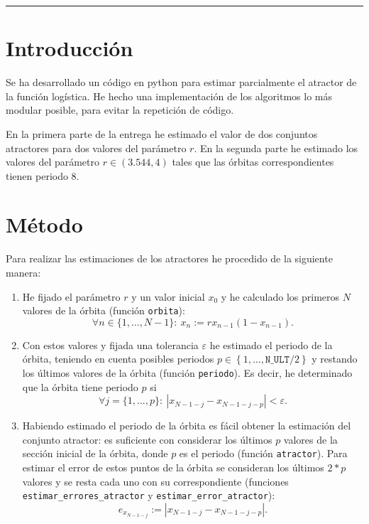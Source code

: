 \documentclass[10pt, spanish]{article}
\theoremstyle{definition}
\theoremstyle{break}
\begin{document}
 \noindent\rule{17cm}{1pt}

\section{Introducción}

Se ha desarrollado un código en python para estimar parcialmente el atractor de
la función logística. He hecho una implementación de los algoritmos lo más
modular posible, para evitar la repetición de código.

En la primera parte de la entrega he estimado el valor de dos conjuntos
atractores para dos valores del parámetro $r$. En la segunda parte he estimado los valores del parámetro $r\in(3.544,4)$ tales
que las órbitas correspondientes tienen periodo 8.

\section{Método}

Para realizar las estimaciones de los atractores he procedido de la siguiente manera:
\begin{enumerate}
    \item He fijado el parámetro $r$ y un valor inicial $x_0$ y he calculado los
        primeros $N$ valores de la órbita (función \texttt{orbita}):
        \[\forall n\in\{1,\ldots,N-1\}:\ x_n := rx_{n-1}(1-x_{n-1}).\] 
    \item Con estos valores y fijada una tolerancia $\varepsilon$ he estimado el
        periodo de la órbita, teniendo en cuenta posibles periodos $p\in\left\{
        1,\ldots, \texttt{N\_ULT}/2 \right\} $ y
        restando los últimos valores de la órbita (función
        \texttt{periodo}). Es decir, he determinado que la órbita tiene periodo
        $p$ si
        \[\forall j = \{1, \ldots, p\}:\ \left| x_{N-1-j}-x_{N-1-j-p} \right| <\varepsilon.\]
    \item Habiendo estimado el periodo de la órbita es fácil obtener la
        estimación del conjunto atractor: es suficiente con considerar los
        últimos $p$ valores de la sección inicial de la órbita, donde $p$ es el
        periodo (función \texttt{atractor}). Para estimar el error de estos puntos de la órbita se
        consideran los últimos $2*p$ valores y se resta cada uno con su
        correspondiente (funciones \texttt{estimar\_errores\_atractor} y
        \texttt{estimar\_error\_atractor}):
        \[e_{x_{N-1-j}}:=\left|x_{N-1-j}-x_{N-1-j-p}\right|.\]
\end{enumerate}
\end{document}
